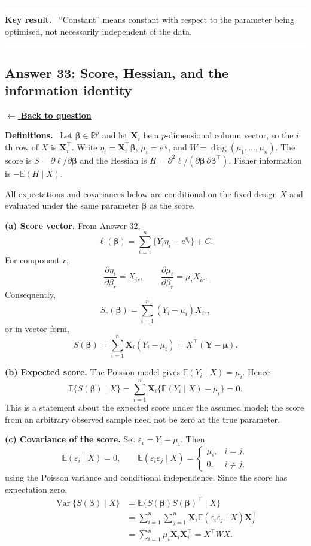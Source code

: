\documentclass[11pt,a4paper]{article}
\newcommand{\given}{\mathrel{|}}
\newcommand{\E}{\mathbb{E}}
\newcommand{\answernav}[1]{%
  \label{answer:#1}%
  \noindent\hyperref[question:#1]{$\leftarrow$ \textbf{Back to question}}%
  \par\smallskip}
\newcommand{\studyheading}[1]{%
  \par\medskip\noindent\textcolor{statblue}{\textbf{#1.}}\ }
\newenvironment{keyresult}
  {\begin{center}\begin{minipage}{0.92\linewidth}\color{statblue}%
   \hrule\vspace{6pt}\textbf{Key result.}\ }
  {\vspace{6pt}\hrule\end{minipage}\end{center}}
\begin{document}
\begin{keyresult}
``Constant'' means constant with respect to the parameter being optimised,
not necessarily independent of the data.
\end{keyresult}

\clearpage

\subsection{Answer 33: Score, Hessian, and the information identity}
\answernav{33}

\studyheading{Definitions}
Let $\boldsymbol\beta\in\mathbb R^p$ and let $\mathbf X_i$ be a $p$-dimensional column vector, so the $i$th row of $X$ is $\mathbf X_i^\top$.
Write $\eta_i=\mathbf X_i^\top\boldsymbol\beta$, $\mu_i=e^{\eta_i}$, and $W=\operatorname{diag}(\mu_1,\ldots,\mu_n)$.
The score is $S=\partial\ell/\partial\boldsymbol\beta$ and the Hessian is
$H=\partial^2\ell/(\partial\boldsymbol\beta\,\partial\boldsymbol\beta^\top)$.
Fisher information is $-\E(H\given X)$.

All expectations and covariances below are conditional on the fixed design
$X$ and evaluated under the same parameter $\boldsymbol\beta$ as the score.

\textbf{(a) Score vector.}
From Answer 32,
\[
\ell(\boldsymbol\beta)
=\sum_{i=1}^n\{Y_i\eta_i-e^{\eta_i}\}+C.
\]
For component $r$,
\[
\frac{\partial\eta_i}{\partial\beta_r}=X_{ir},
\qquad
\frac{\partial\mu_i}{\partial\beta_r}=\mu_iX_{ir}.
\]
Consequently,
\[
S_r(\boldsymbol\beta)
=\sum_{i=1}^n(Y_i-\mu_i)X_{ir},
\]
or in vector form,
\[
\boxed{
S(\boldsymbol\beta)
=\sum_{i=1}^n\mathbf X_i(Y_i-\mu_i)
=X^\top(\mathbf Y-\boldsymbol\mu).
}
\]

\textbf{(b) Expected score.}
The Poisson model gives $\E(Y_i\given X)=\mu_i$. Hence
\[
\boxed{
\E\{S(\boldsymbol\beta)\given X\}
=\sum_{i=1}^n\mathbf X_i\{\E(Y_i\given X)-\mu_i\}
=\mathbf0.
}
\]
This is a statement about the expected score under the assumed model;
the score from an arbitrary observed sample need not be zero at the true
parameter.

\textbf{(c) Covariance of the score.}
Set $\varepsilon_i=Y_i-\mu_i$. Then
\[
\E(\varepsilon_i\given X)=0,
\qquad
\E(\varepsilon_i\varepsilon_j\given X)
=\begin{cases}
\mu_i,&i=j,\\
0,&i\ne j,
\end{cases}
\]
using the Poisson variance and conditional independence. Since the score
has expectation zero,
\begin{align*}
\operatorname{Var}\{S(\boldsymbol\beta)\given X\}
&=\E\{S(\boldsymbol\beta)S(\boldsymbol\beta)^\top\given X\}\\
&=\sum_{i=1}^n\sum_{j=1}^n
\mathbf X_i\E(\varepsilon_i\varepsilon_j\given X)\mathbf X_j^\top\\
&=\sum_{i=1}^n\mu_i\mathbf X_i\mathbf X_i^\top
=X^\top WX.
\end{align*}
\end{document}
